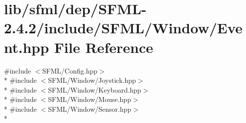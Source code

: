 \hypertarget{lib_2sfml_2dep_2_s_f_m_l-2_84_82_2include_2_s_f_m_l_2_window_2_event_8hpp}{\section{lib/sfml/dep/\-S\-F\-M\-L-\/2.4.2/include/\-S\-F\-M\-L/\-Window/\-Event.hpp File Reference}
\label{lib_2sfml_2dep_2_s_f_m_l-2_84_82_2include_2_s_f_m_l_2_window_2_event_8hpp}
}
{\ttfamily \#include $<$S\-F\-M\-L/\-Config.\-hpp$>$}\\*
{\ttfamily \#include $<$S\-F\-M\-L/\-Window/\-Joystick.\-hpp$>$}\\*
{\ttfamily \#include $<$S\-F\-M\-L/\-Window/\-Keyboard.\-hpp$>$}\\*
{\ttfamily \#include $<$S\-F\-M\-L/\-Window/\-Mouse.\-hpp$>$}\\*
{\ttfamily \#include $<$S\-F\-M\-L/\-Window/\-Sensor.\-hpp$>$}\\*
